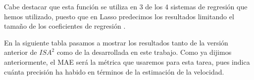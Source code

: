 Cabe destacar que esta función se utiliza en 3 de los 4 sistemas de regresión que hemos utilizado, puesto que en Lasso predecimos los resultados limitando el tamaño de los coeficientes de regresión \cite{coef_lasso}.

En la siguiente tabla pasamos a mostrar los resultados tanto de la versión anterior de $ISA^{2}$ \cite{isa2} como de la desarrollada en este trabajo. Como ya dijimos anteriormente, el \ac{MAE} será la métrica que usaremos para esta tarea, pues indica cuánta precisión ha habido en términos de la estimación de la velocidad.

\begin{table}[H]
\centering
{}
\end{table}
